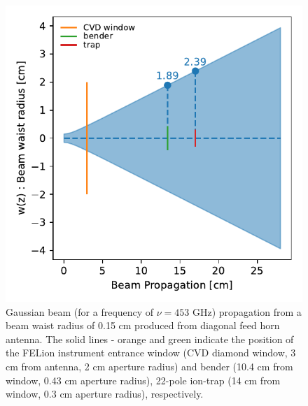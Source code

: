\begin{figure}[!htb]
    \centering
    \includegraphics[scale=0.7]{figures/measurements/power-curve-453GHz/beam_propagation.pdf}
    \caption{Gaussian beam (for a frequency of $\nu=453$ GHz) propagation from a beam waist radius of 0.15 cm produced from diagonal feed horn antenna. The solid lines - orange and green indicate the position of the FELion instrument entrance window (CVD diamond window, 3 cm from antenna, 2 cm aperture radius) and bender (10.4 cm from window, 0.43 cm aperture radius), 22-pole ion-trap (14 cm from window, 0.3 cm aperture radius), respectively.}
    \label{fig:power-curve:beam-propagation}
\end{figure}
